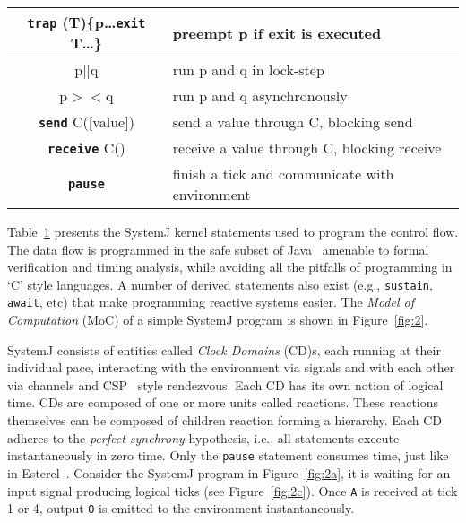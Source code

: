\begin{table}[tb]
\begin{minipage}{8cm}
\begin{scriptsize}
\begin{tabular}{|c|p{80pt}|}
     \textbf{\texttt{trap}} (T)\{p\ldots \textbf{\texttt{exit}} T\ldots\} & preempt p if exit is executed\\                         
     \hline                                                                                     
     p\textbf{\texttt{$||$}}q & run p and q in lock-step\\                                                        
     \hline                                                                                     
     p$><$q & run p and q asynchronously\\                                                      
     \hline                                                                                     
     \textbf{\texttt{send}} C([value]) & send a value through C, blocking
     send\\                                                 
     \hline                                                                                     
     \textbf{\texttt{receive}} C() & receive a value through C, blocking
     receive\\
     \hline                                                                                     
     \textbf{\texttt{pause}} & finish a tick and communicate
     with environment\\
     \hline                                                                                     
   \end{tabular}
  \end{scriptsize}
 \end{minipage}
 \label{tab:1}
\end{table}

Table~\ref{tab:1} presents the SystemJ kernel statements used to program
the control flow. The data flow is programmed in the safe subset of
Java~\cite{scj2013} amenable to formal verification and timing analysis,
while avoiding all the pitfalls of programming in `C' style languages. A
number of derived statements also exist (e.g., \texttt{sustain},
\texttt{await}, etc) that make programming reactive systems easier. The
\textit{Model of Computation} (MoC) of a simple SystemJ program is shown
in Figure~\ref{fig:2}.

SystemJ consists of entities called \textit{Clock Domains} (CD)s, each
running at their individual pace, interacting with the environment via
signals and with each other via channels and CSP~\cite{choa85} style
rendezvous. Each CD has its own notion of logical time. CDs are composed
of one or more units called reactions. These reactions themselves can be
composed of children reaction forming a hierarchy. Each CD adheres to
the \textit{perfect synchrony} hypothesis, i.e., all statements execute
instantaneously in zero time. Only the \texttt{pause} statement consumes
time, just like in Esterel~\cite{gber931}. Consider the SystemJ program
in Figure~\ref{fig:2a}, it is waiting for an input signal producing
logical ticks (see Figure~\ref{fig:2c}). Once \texttt{A} is received at
tick 1 or 4, output \texttt{O} is emitted to the environment
instantaneously.

